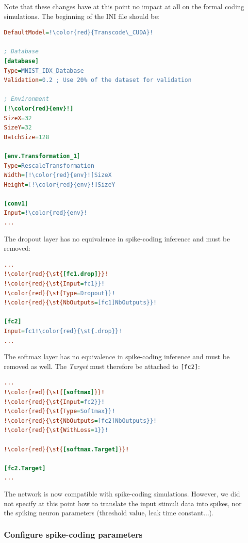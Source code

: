 \documentclass[a4paper,11pt,oneside]{article}
\begin{document}
Note that these changes have at this point no impact at all on the formal coding
simulations. The beginning of the INI file should be:

\begin{lstlisting}[language=ini,escapechar=!]
DefaultModel=!\color{red}{Transcode\_CUDA}!

; Database
[database]
Type=MNIST_IDX_Database
Validation=0.2 ; Use 20% of the dataset for validation

; Environment
[!\color{red}{env}!]
SizeX=32
SizeY=32
BatchSize=128

[env.Transformation_1]
Type=RescaleTransformation
Width=[!\color{red}{env}!]SizeX
Height=[!\color{red}{env}!]SizeY

[conv1]
Input=!\color{red}{env}!
...
\end{lstlisting}

The dropout layer has no equivalence in spike-coding inference and must be
removed:

\begin{lstlisting}[language=ini,escapechar=!]
...
!\color{red}{\st{[fc1.drop]}}!
!\color{red}{\st{Input=fc1}}!
!\color{red}{\st{Type=Dropout}}!
!\color{red}{\st{NbOutputs=[fc1]NbOutputs}}!

[fc2]
Input=fc1!\color{red}{\st{.drop}}!
...
\end{lstlisting}

The softmax layer has no equivalence in spike-coding inference and must be
removed as well. The \emph{Target} must therefore be attached to
\lstinline![fc2]!:

\begin{lstlisting}[language=ini,escapechar=!]
...
!\color{red}{\st{[softmax]}}!
!\color{red}{\st{Input=fc2}}!
!\color{red}{\st{Type=Softmax}}!
!\color{red}{\st{NbOutputs=[fc2]NbOutputs}}!
!\color{red}{\st{WithLoss=1}}!

!\color{red}{\st{[softmax.Target]}}!

[fc2.Target]
...
\end{lstlisting}

The network is now compatible with spike-coding simulations. However, we did not
specify at this point how to translate the input stimuli data into spikes, nor
the spiking neuron parameters (threshold value, leak time constant...).

\subsubsection{Configure spike-coding parameters}
\end{document}
